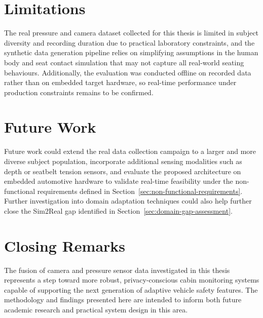 \section{Limitations}
\label{sec:limitations}
The real pressure and camera dataset collected for this thesis is limited
in subject diversity and recording duration due to practical laboratory
constraints, and the synthetic data generation pipeline relies on
simplifying assumptions in the human body and seat contact simulation
that may not capture all real-world seating behaviours. Additionally, the
evaluation was conducted offline on recorded data rather than on embedded
target hardware, so real-time performance under production constraints
remains to be confirmed.

\section{Future Work}
\label{sec:future-work}
Future work could extend the real data collection campaign to a larger
and more diverse subject population, incorporate additional sensing
modalities such as depth or seatbelt tension sensors, and evaluate the
proposed architecture on embedded automotive hardware to validate
real-time feasibility under the non-functional requirements defined in
Section~\ref{sec:non-functional-requirements}. Further investigation into
domain adaptation techniques could also help further close the Sim2Real
gap identified in Section~\ref{sec:domain-gap-assessment}.

\section{Closing Remarks}
\label{sec:closing-remarks}
The fusion of camera and pressure sensor data investigated in this
thesis represents a step toward more robust, privacy-conscious cabin
monitoring systems capable of supporting the next generation of adaptive
vehicle safety features. The methodology and findings presented here are
intended to inform both future academic research and practical system
design in this area.
